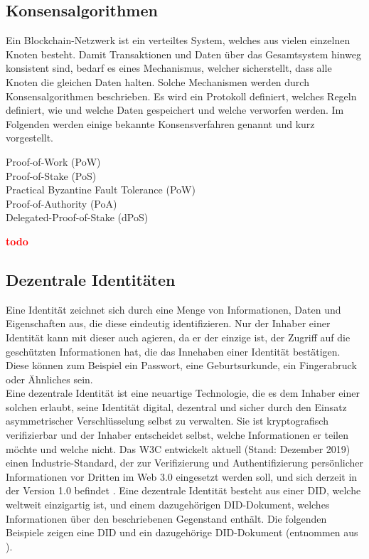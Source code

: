 \subsection{Konsensalgorithmen}
\label{subsec:fundamentals:dlt:consensus}
Ein Blockchain-Netzwerk ist ein verteiltes System, welches aus vielen einzelnen Knoten besteht. Damit Transaktionen und Daten über das Gesamtsystem hinweg konsistent sind, bedarf es eines Mechanismus, welcher sicherstellt, dass alle Knoten die gleichen Daten halten. Solche Mechanismen werden durch Konsensalgorithmen beschrieben. Es wird ein Protokoll definiert, welches Regeln definiert, wie und welche Daten gespeichert und welche verworfen werden. Im Folgenden werden einige bekannte Konsensverfahren genannt und kurz vorgestellt.
\begin{description}
  \item[Proof-of-Work (PoW)]
  \item[Proof-of-Stake (PoS)]
  \item[Practical Byzantine Fault Tolerance (PoW)]
  \item[Proof-of-Authority (PoA)]
  \item[Delegated-Proof-of-Stake (dPoS)]
\end{description}
\textbf{\textcolor{red}{todo}}


\subsection{Dezentrale Identitäten}
\label{subsec:fundamentals:dlt:did}
Eine Identität zeichnet sich durch eine Menge von Informationen, Daten und Eigenschaften aus, die diese eindeutig identifizieren. Nur der Inhaber einer Identität kann mit dieser auch agieren, da er der einzige ist, der Zugriff auf die geschützten Informationen hat, die das Innehaben einer Identität bestätigen. Diese können zum Beispiel ein Passwort, eine Geburtsurkunde, ein Fingerabruck oder Ähnliches sein.\\
Eine dezentrale Identität ist eine neuartige Technologie, die es dem Inhaber einer solchen erlaubt, seine Identität digital, dezentral und sicher durch den Einsatz asymmetrischer Verschlüsselung selbst zu verwalten. Sie ist kryptografisch verifizierbar und der Inhaber entscheidet selbst, welche Informationen er teilen möchte und welche nicht. Das \ac{W3C} entwickelt aktuell (Stand: Dezember 2019) einen Industrie-Standard, der zur Verifizierung und Authentifizierung persönlicher Informationen vor Dritten im Web 3.0 eingesetzt werden soll, und sich derzeit in der Version 1.0 befindet \cite{did2019}. Eine dezentrale Identität besteht aus einer \ac{DID}, welche weltweit einzigartig ist, und einem dazugehörigen DID-Dokument, welches Informationen über den beschriebenen Gegenstand enthält. Die folgenden Beispiele zeigen eine \ac{DID} und ein dazugehörige DID-Dokument (entnommen aus \cite{did2019}).

